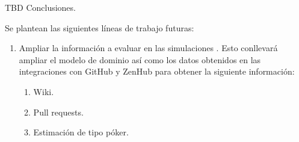 

TBD Conclusiones.

Se plantean las siguientes líneas de trabajo futuras:

\begin{enumerate}
	\item Ampliar la información a evaluar en las simulaciones . Esto conllevará ampliar el modelo de dominio así como los datos obtenidos en las integraciones con GitHub y ZenHub para obtener la siguiente información:
	\begin{enumerate}
		\item Wiki.
		\item Pull requests.
		\item Estimación de tipo póker.
	\end{enumerate} 	
\end{enumerate} 
